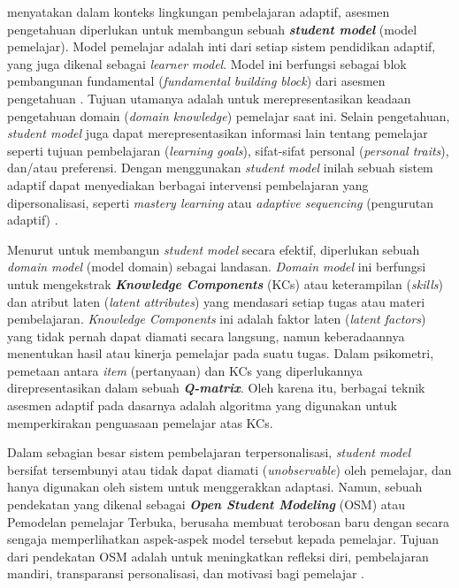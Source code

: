\textcite{Brusilovsky2016} menyatakan dalam konteks lingkungan pembelajaran adaptif, asesmen pengetahuan diperlukan
untuk membangun sebuah \textbf{\textit{student model}} (model pemelajar). Model
pemelajar adalah inti dari setiap sistem pendidikan adaptif, yang juga dikenal
sebagai \textit{learner model}. Model ini berfungsi
sebagai blok pembangunan fundamental (\textit{fundamental building block}) dari
asesmen pengetahuan \autocite{Minn2022}. Tujuan utamanya adalah untuk
merepresentasikan keadaan pengetahuan domain (\textit{domain knowledge})
pemelajar saat ini. Selain pengetahuan, \textit{student model} juga dapat
merepresentasikan informasi lain tentang pemelajar seperti tujuan pembelajaran
(\textit{learning goals}), sifat-sifat personal (\textit{personal traits}),
dan/atau preferensi. Dengan menggunakan
\textit{student model} inilah sebuah sistem adaptif dapat menyediakan berbagai
intervensi pembelajaran yang dipersonalisasi, seperti
\textit{mastery learning} atau \textit{adaptive sequencing}
(pengurutan adaptif) \autocite{Brusilovsky2016}.

Menurut \textcite{Minn2022} untuk membangun \textit{student model} secara efektif, diperlukan sebuah
\textit{domain model} (model domain) sebagai landasan.
\textit{Domain model} ini berfungsi untuk mengekstrak
\textit{\textbf{Knowledge Components}} (KCs) atau keterampilan (\textit{skills})
dan atribut laten (\textit{latent attributes}) yang mendasari setiap tugas atau
materi pembelajaran. \textit{Knowledge Components} ini adalah
faktor laten (\textit{latent factors}) yang tidak pernah dapat diamati secara
langsung, namun keberadaannya menentukan hasil atau kinerja pemelajar pada
suatu tugas. Dalam psikometri,
pemetaan antara \textit{item} (pertanyaan) dan KCs yang diperlukannya direpresentasikan dalam sebuah \textit{\textbf{Q-matrix}}.
Oleh karena itu, berbagai teknik asesmen adaptif pada dasarnya adalah algoritma yang digunakan untuk memperkirakan penguasaan
pemelajar atas KCs.

Dalam sebagian besar sistem pembelajaran terpersonalisasi,
\textit{student model} bersifat tersembunyi atau tidak dapat diamati
(\textit{unobservable}) oleh pemelajar, dan hanya digunakan oleh sistem untuk
menggerakkan adaptasi. Namun, sebuah pendekatan yang
dikenal sebagai \textbf{\textit{Open Student Modeling}} (OSM) atau
Pemodelan pemelajar Terbuka, berusaha membuat terobosan baru dengan secara sengaja
memperlihatkan aspek-aspek model tersebut kepada pemelajar. Tujuan dari
pendekatan OSM adalah untuk meningkatkan refleksi diri, pembelajaran mandiri, transparansi personalisasi, dan motivasi bagi pemelajar
\autocite{Brusilovsky2016, Ihichr2024}.

